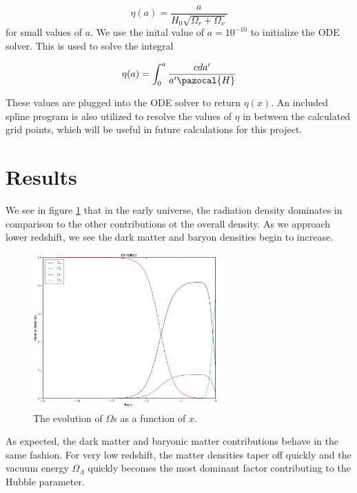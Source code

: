 \documentclass[a4paper]{article}
\begin{document}
\begin{equation}\label{eq:etainit}
\eta(a) = \dfrac{a}{H_0\sqrt{\Omega_r + \Omega_{\nu}}}
\end{equation}
for small values of $a$. We use the inital value of $a = 10^{-10}$ to initialize the ODE solver. This is used to solve the integral

\begin{equation}\label{eq:etaint}
\eta(a) = \int_0^a \dfrac{c da'}{a' \pazocal{H}}
\end{equation}

These values are plugged into the ODE solver to return $\eta(x)$. An included spline program is also utilized to resolve the values of $\eta$ in between the calculated grid points, which will be useful in future calculations for this project. 

\clearpage


\section{Results}\label{Results}

We see in figure \ref{fig:dens} that in the early universe, the radiation density dominates in comparison to the other contributions ot the overall density. As we approach lower redshift, we see the dark matter and baryon densities begin to increase.
\begin{figure}\label{fig:dens}
  \begin{center}
    \includegraphics[width=0.65\textwidth]{densities2}
  \end{center}
  \caption{The evolution of $\Omega$s as a function of $x$.}
\end{figure} 
As expected, the dark matter and baryonic matter contributions behave in the same fashion. For very low redshift, the matter densities taper off quickly and the vacuum energy $\Omega_{\Lambda}$ quickly becomes the most dominant factor contributing to the Hubble parameter.
\end{document}
